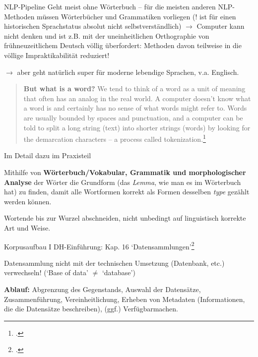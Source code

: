 \documentclass[10pt,a4paper]{article}
\begin{document}
\begin{multicols}{3}
\begin{textbox}{NLP-Pipeline}
Geht meist ohne Wörterbuch -- für die meisten anderen NLP-Methoden müssen Wörterbücher und Grammatiken vorliegen (! ist für einen historischen Sprachstatus absolut nicht selbstverständlich) $\to$ Computer kann nicht denken und ist z.B. mit der uneinheitlichen Orthographie von frühneuzeitlichem Deutsch völlig überfordert: Methoden davon teilweise in die völlige Impraktikabilität reduziert! 

$\to$ aber geht natürlich super für moderne lebendige Sprachen, v.a. Englisch.

\begin{quote}
    \textbf{But what is a word?} We tend to think of a word as a unit of meaning that often has an analog in the real world. \punkti A computer doesn't know what a word is and certainly has no sense of what words might refer to.
    \punkti 
    Words are usually bounded by spaces and punctuation, and a computer can be told to split a long string (text) into shorter strings (words) by looking for the demarcation characters \punkti -- a process called tokenization.\footcite[283]{textvisual}
\end{quote}
\end{textbox}


\begin{textbox}{Im Detail dazu im Praxisteil}

 Mithilfe von \textbf{Wörterbuch/Vokabular, Grammatik und morphologischer Analyse} der Wörter die Grundform (das \emph{Lemma}, wie man es im Wörterbuch hat) zu finden, damit alle Wortformen korrekt als Formen desselben \emph{type} gezählt werden können.

 Wortende bis zur Wurzel abschneiden, nicht unbedingt auf linguistisch korrekte Art und Weise.



\end{textbox}


\begin{textbox}{Korpusaufbau I}
DH-Einführung: Kap. 16 `Datensammlungen'\footcite{DHIntroDatensammlungen}

Datensammlung nicht mit der technischen Umsetzung (Datenbank, etc.) verwechseln! (`Base of data' $\neq$ `database')

\textbf{Ablauf:} Abgrenzung des Gegenstands, Auswahl der Datensätze, Zusammenführung, Vereinheitlichung, Erheben von Metadaten (Informationen, die die Datensätze beschreiben), (ggf.) Verfügbarmachen.


\end{textbox}
\end{multicols}
\end{document}
